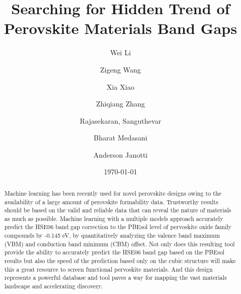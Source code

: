 \documentclass[twocolumn,
superscriptaddress,
 amsmath,amssymb,
 aps, citeautoscript,
prb,
]{revtex4-1}
\begin{document}

\title{Searching for Hidden Trend of Perovskite Materials Band Gaps}

\author{Wei Li}
\author{Zigeng Wang}
\author{Xia Xiao}
\author{Zhiqiang Zhang}
\author{Rajasekaran, Sanguthevar}
\author{Bharat Medasani}
\author{Anderson Janotti}

\date{\today}%
\begin{abstract}

Machine learning has been recently used for novel perovskite designs owing to the availability of a large amount of perovskite formability data. Trustworthy results should be based on the valid and reliable data that can reveal the nature of materials as much as possible. Machine learning with a multiple models approach accurately predict the HSE06 band gap correction to the PBEsol level of pervoskite oxide family compounds by -0.145 eV, by quantitatively analyzing the valence band maximum (VBM) and conduction band minimum (CBM) offset. Not only does this resulting tool provide the ability to accurately predict the HSE06 band gap based on the PBEsol results but also the speed of the prediction based only on the cubic structure will make this a great resource to screen functional pervoskite materials. And this design represents a powerful database and tool paves a way for mapping the vast materials landscape and accelerating discovery. 


\end{abstract}
\end{document}
